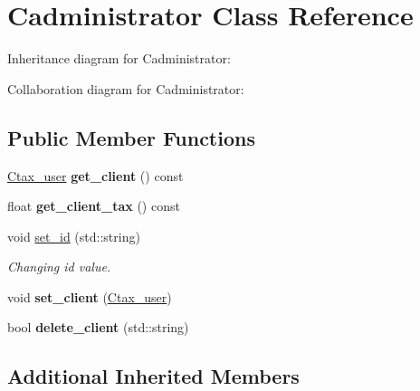 \hypertarget{class_cadministrator}{\section{Cadministrator Class Reference}
\label{class_cadministrator}
}


Inheritance diagram for Cadministrator\+:


Collaboration diagram for Cadministrator\+:
\subsection*{Public Member Functions}
\begin{DoxyCompactItemize}
\item 
\hypertarget{class_cadministrator_a212b0a98d22c9cdb498510d2c309328b}{\hyperlink{class_ctax__user}{Ctax\+\_\+user} {\bfseries get\+\_\+client} () const }\label{class_cadministrator_a212b0a98d22c9cdb498510d2c309328b}

\item 
\hypertarget{class_cadministrator_a9b30221bef8595f69d6b12000e630a16}{float {\bfseries get\+\_\+client\+\_\+tax} () const }\label{class_cadministrator_a9b30221bef8595f69d6b12000e630a16}

\item 
void \hyperlink{class_cadministrator_a8275d3e8325e513b1d2c474e4afc7fe9}{set\+\_\+id} (std\+::string)
\begin{DoxyCompactList}\small\item\em Changing id value. \end{DoxyCompactList}\item 
\hypertarget{class_cadministrator_a15bcf44c8bdba7a8f7a61599558c27c1}{void {\bfseries set\+\_\+client} (\hyperlink{class_ctax__user}{Ctax\+\_\+user})}\label{class_cadministrator_a15bcf44c8bdba7a8f7a61599558c27c1}

\item 
\hypertarget{class_cadministrator_a1dbdfcca78d921b353624eb95958b19a}{bool {\bfseries delete\+\_\+client} (std\+::string)}\label{class_cadministrator_a1dbdfcca78d921b353624eb95958b19a}

\end{DoxyCompactItemize}
\subsection*{Additional Inherited Members}


